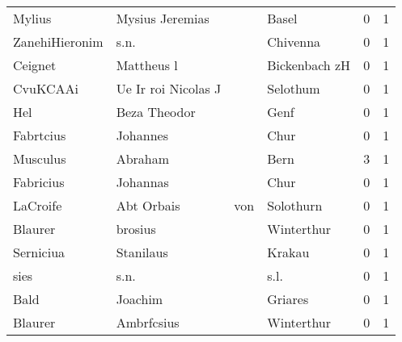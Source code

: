\begin{center}
\begin{tiny}
\begin{longtabu}{llllrr}
                   Mylius &                    Mysius Jeremias &             &                                       Basel &          0 &         1 \\
           ZanehiHieronim &                               s.n. &             &                                    Chivenna &          0 &         1 \\
                  Ceignet &                         Mattheus l &             &                               Bickenbach zH &          0 &         1 \\
                 CvuKCAAi &                Ue Ir roi Nicolas J &             &                                    Selothum &          0 &         1 \\
                      Hel &                       Beza Theodor &             &                                        Genf &          0 &         1 \\
                Fabrtcius &                           Johannes &             &                                        Chur &          0 &         1 \\
                 Musculus &                            Abraham &             &                                        Bern &          3 &         1 \\
                Fabricius &                           Johannas &             &                                        Chur &          0 &         1 \\
                 LaCroife &                        Abt  Orbais &         von &                                   Solothurn &          0 &         1 \\
                  Blaurer &                            brosius &             &                                  Winterthur &          0 &         1 \\
                Serniciua &                          Stanilaus &             &                                      Krakau &          0 &         1 \\
                     sies &                               s.n. &             &                                        s.l. &          0 &         1 \\
                     Bald &                            Joachim &             &                                     Griares &          0 &         1 \\
                  Blaurer &                         Ambrfcsius &             &                                  Winterthur &          0 &         1 \\

\end{longtabu}
\end{tiny}
\end{center}

